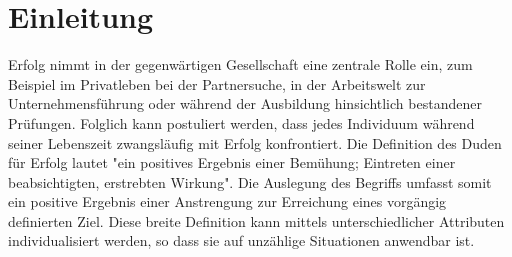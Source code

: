 \chapter{Einleitung}
Erfolg nimmt in der gegenwärtigen Gesellschaft eine zentrale Rolle ein, zum Beispiel im Privatleben bei der Partnersuche, in der Arbeitswelt zur Unternehmensführung oder während der Ausbildung hinsichtlich bestandener Prüfungen. Folglich kann postuliert werden, dass jedes Individuum während seiner Lebenszeit zwangsläufig mit Erfolg konfrontiert. Die Definition des Duden für Erfolg lautet "ein positives Ergebnis einer Bemühung; Eintreten einer beabsichtigten, erstrebten Wirkung". Die Auslegung des Begriffs umfasst somit ein positive Ergebnis einer Anstrengung zur Erreichung eines vorgängig definierten Ziel. Diese breite Definition kann mittels unterschiedlicher Attributen individualisiert werden, so dass sie auf unzählige Situationen anwendbar ist.
\newline\newline
